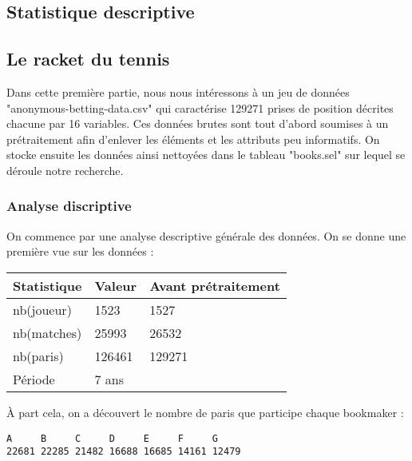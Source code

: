 \documentclass{article}
\begin{document}
\begin{multicols}{2} %


\section{Statistique descriptive}
	\subsection{ Le racket du tennis}
	Dans cette première partie, nous nous intéressons à un jeu de données "anonymous-betting-data.csv" qui caractérise 129271 prises de position décrites chacune par 16 variables. Ces données brutes sont tout d'abord soumises à un prétraitement afin d'enlever les éléments et les attributs peu informatifs. On stocke ensuite les données ainsi nettoyées dans le tableau "books.sel" sur lequel se déroule notre recherche.
	
	\subsubsection{Analyse discriptive}

	On commence par une analyse descriptive générale des données. 
	On se donne une première vue sur les données :
	
\begin{footnotesize}
	\begin{center}
		\begin{tabular}[H]{|l|l|l|}
			\hline
			Statistique	& Valeur & Avant prétraitement\\ 
			\hline
			nb(joueur)	& 1523	 & 1527  \\ 
			nb(matches)	& 25993  & 26532 \\ 
			nb(paris)	& 126461 & 129271 \\
			Période		& 7 ans	 & \\
			\hline
		\end{tabular} 
	\end{center}	
\end{footnotesize}
	
	À part cela, on a découvert le nombre de paris que participe chaque bookmaker :
	\begin{mdframed}
		\begin{footnotesize}
			\begin{Verbatim}
A     B     C     D     E     F     G 
22681 22285 21482 16688 16685 14161 12479 
			\end{Verbatim}
		\end{footnotesize}
	\end{mdframed}
	

\end{multicols}
\end{document}
